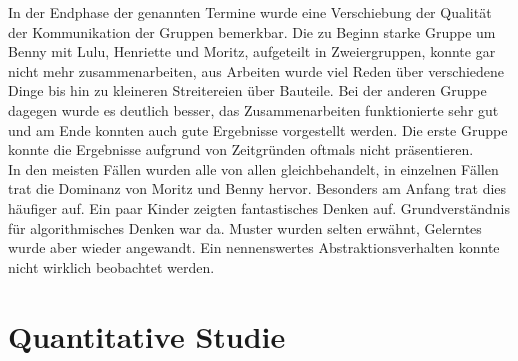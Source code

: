 	In der Endphase der genannten Termine wurde eine Verschiebung der Qualität der Kommunikation der Gruppen bemerkbar. Die zu Beginn starke Gruppe um Benny mit Lulu, Henriette und Moritz, aufgeteilt in Zweiergruppen, konnte gar nicht mehr zusammenarbeiten, aus Arbeiten wurde viel Reden über verschiedene Dinge bis hin zu kleineren Streitereien über Bauteile. Bei der anderen Gruppe dagegen wurde es deutlich besser, das Zusammenarbeiten funktionierte sehr gut und am Ende konnten auch gute Ergebnisse vorgestellt werden. Die erste Gruppe konnte die Ergebnisse aufgrund von Zeitgründen oftmals nicht präsentieren.\\
	In den meisten Fällen wurden alle von allen gleichbehandelt, in einzelnen Fällen trat die Dominanz von Moritz und Benny hervor. Besonders am Anfang trat dies häufiger auf. Ein paar Kinder zeigten fantastisches Denken auf. Grundverständnis für algorithmisches Denken war da. Muster wurden selten erwähnt, Gelerntes wurde aber wieder angewandt. Ein nennenswertes Abstraktionsverhalten konnte nicht wirklich beobachtet werden.


\chapter[Quantitative Studie]{Quantitative Studie}